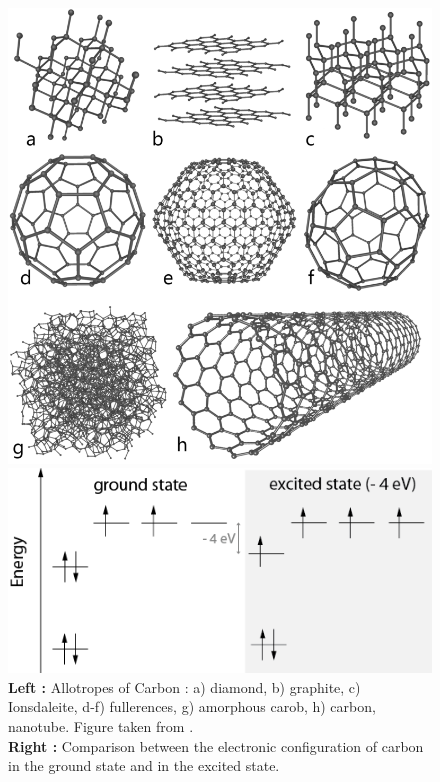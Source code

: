 		\begin{figure}[htbp]
			\begin{minipage}[b]{0.4\textwidth} 
				\includegraphics[width=\textwidth]{figures/Carbon/carbonAllotropes.png}		
			\end{minipage}
			\hfill
			\begin{minipage}[t]{0.5\textwidth}
			\centering
			\includegraphics[width=\textwidth]{figures/Carbon/carbonElectronicConfiguration.png}
			\end{minipage}
			\caption{\textbf{Left :} Allotropes of Carbon : a) diamond, b) graphite, c) Ionsdaleite, d-f) fullerences, g) amorphous carob, h) carbon, nanotube. Figure taken from \cite{enWikiAllotropesOfCarbon}. \\
			\textbf{Right :} Comparison between the electronic configuration of carbon in the ground state and in the excited state.}		
		\end{figure}


